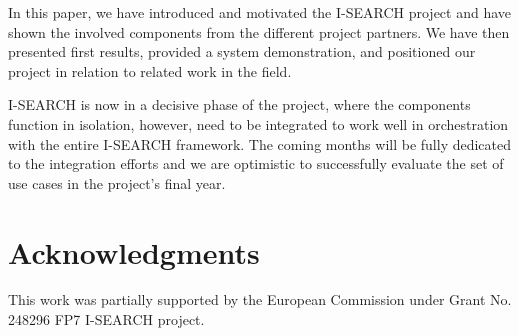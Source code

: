 \documentclass{acm_proc_article-sp}
\newcommand{\inlinelistingsize}{\fontsize{8pt}{11pt}}
\let\oldttdefault\ttdefault
\renewcommand{\ttdefault}{pcr}
\let\oldurl\url
\renewcommand{\url}[1]{\inlinelistingsize\oldurl{#1}}
\begin{document}
In this paper, we have introduced and motivated the \mbox{I-SEARCH} project and have shown the involved components from the different project partners.
We have then presented first results, provided a system demonstration, and positioned our project in relation to related work in the field.

\mbox{I-SEARCH} is now in a decisive phase of the project, where the components function in isolation, however, need to be integrated to work well in orchestration with the entire \mbox{I-SEARCH} framework.
The coming months will be fully dedicated to the integration efforts and we are optimistic to successfully evaluate the set of use cases in the project's final year.

\section{Acknowledgments}
This work was partially supported by the European Commission under Grant No. 248296 FP7 \mbox{I-SEARCH} project.

\let\ttdefault\oldttdefault
\let\url\oldurl




\balancecolumns
\end{document}
